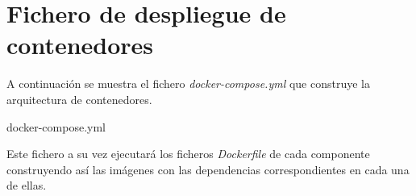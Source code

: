 \documentclass[../../main.tex]{subfiles}
\begin{document}
\chapter{Fichero de despliegue de contenedores}\label{ch:anexo_docker}
A continuación se muestra el fichero \textit{docker-compose.yml} que construye la arquitectura de contenedores.


                {docker-compose.yml}
                
Este fichero a su vez ejecutará los ficheros \textit{Dockerfile} de cada componente construyendo así las imágenes con las dependencias correspondientes en cada una de ellas.
\end{document}
